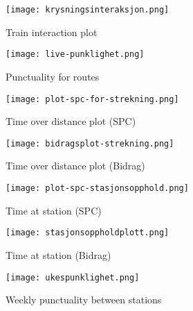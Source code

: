 \begin{figure}[!htbp]
	\texttt{[image: krysningsinteraksjon.png]}
	\caption[Train interaction plot]{Train interaction plot \cite{sintefPresis}}
	\label{fig:krysningsinteraksjon}
\end{figure}
\pagebreak

\begin{figure}[!htbp]
	\texttt{[image: live-punklighet.png]}
	\caption[Punctuality for routes]{Punctuality for routes \cite{sintefPresis}}
	\label{fig:live-punklighet}
\end{figure}
\pagebreak

\begin{figure}[!htbp]
	\texttt{[image: plot-spc-for-strekning.png]}
	\caption[Time over distance plot (SPC)]{Time over distance plot (SPC) \cite{sintefPresis}}
	\label{fig:plot-spc-for-strekning}
\end{figure}
\pagebreak

\begin{figure}[!htbp]
	\texttt{[image: bidragsplot-strekning.png]}
	\caption[Time over distance plot (Bidrag)]{Time over distance plot (Bidrag) \cite{sintefPresis}}
	\label{fig:bidragsplot-strekning}
\end{figure}
\pagebreak

\begin{figure}[!htbp]
	\texttt{[image: plot-spc-stasjonsopphold.png]}
	\caption[Time at station (SPC)]{Time at station (SPC) \cite{sintefPresis}}
	\label{fig:plot-spc-for-stasjonsopphold}
\end{figure}
\pagebreak

\begin{figure}[!htbp]
	\texttt{[image: stasjonsoppholdplott.png]}
	\caption[Time at station (Bidrag)]{Time at station (Bidrag) \cite{sintefPresis}}
	\label{fig:stasjonsoppholdplott}
\end{figure}
\pagebreak

\begin{figure}[!htbp]
	\texttt{[image: ukespunklighet.png]}
	\caption[Weekly punctuality between stations]{Weekly punctuality between stations \cite{sintefPresis}}
	\label{fig:ukespunklighet}
\end{figure}
\pagebreak
